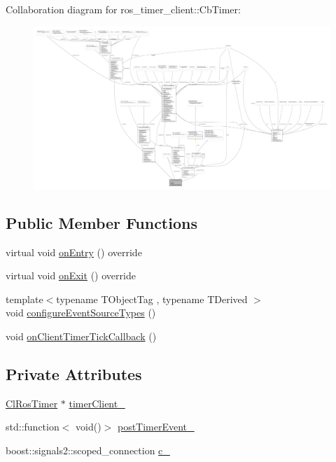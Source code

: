Collaboration diagram for ros\+\_\+timer\+\_\+client\+:\+:Cb\+Timer\+:
\nopagebreak
\begin{figure}[H]
\begin{center}
\leavevmode
\includegraphics[width=350pt]{classros__timer__client_1_1CbTimer__coll__graph}
\end{center}
\end{figure}
\subsection*{Public Member Functions}
\begin{DoxyCompactItemize}
\item 
virtual void \hyperlink{classros__timer__client_1_1CbTimer_a25c086b5988642602938d92f9555ce18}{on\+Entry} () override
\item 
virtual void \hyperlink{classros__timer__client_1_1CbTimer_a27d62ebacf667d4c2518c0416ee7b25b}{on\+Exit} () override
\item 
{\footnotesize template$<$typename T\+Object\+Tag , typename T\+Derived $>$ }\\void \hyperlink{classros__timer__client_1_1CbTimer_a11226b0050d363187aa1bfe3e9c672af}{configure\+Event\+Source\+Types} ()
\item 
void \hyperlink{classros__timer__client_1_1CbTimer_ad75f8dfb3baa32e3ba7d373e8d902b47}{on\+Client\+Timer\+Tick\+Callback} ()
\end{DoxyCompactItemize}
\subsection*{Private Attributes}
\begin{DoxyCompactItemize}
\item 
\hyperlink{classros__timer__client_1_1ClRosTimer}{Cl\+Ros\+Timer} $\ast$ \hyperlink{classros__timer__client_1_1CbTimer_a370d115a7423db45ca375673db8a4ed1}{timer\+Client\+\_\+}
\item 
std\+::function$<$ void()$>$ \hyperlink{classros__timer__client_1_1CbTimer_a7e15bf1451d17c96aba814dc3e5c08e9}{post\+Timer\+Event\+\_\+}
\item 
boost\+::signals2\+::scoped\+\_\+connection \hyperlink{classros__timer__client_1_1CbTimer_a755a7f5d8662ae3b7507da0fe82e5b22}{c\+\_\+}
\end{DoxyCompactItemize}


